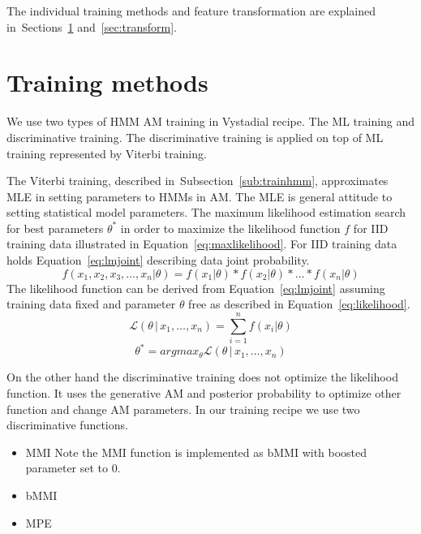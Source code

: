 The individual training methods and feature transformation are explained
in~Sections~\ref{sec:methods} and~\ref{sec:transform}.

\section{Training methods} 
\label{sec:methods}
We use two types of \ac{HMM} \ac{AM} training in Vystadial recipe. 
The \acl{ML} training and discriminative training.
The discriminative training is applied on top of \ac{ML} training represented by Viterbi training.

The Viterbi training, described in~Subsection~\ref{sub:trainhmm}, approximates \ac{MLE} in setting parameters to \ac{HMM}s in \ac{AM}.
The \ac{MLE} is general attitude to setting statistical model parameters.
The maximum likelihood estimation search for best parameters $\theta^*$ 
in order to maximize the likelihood function $f$ for \ac{IID} training data illustrated in Equation~\ref{eq:maxlikelihood}.
For \ac{IID} training data holds Equation~\ref{eq:lmjoint} describing data joint probability. 
\begin{equation}\label{eq:lmjoint}
    f(x_1, x_2, x_3, \ldots, x_n | \theta) = f(x_1 | \theta) * f(x_2 | \theta) * \ldots * f(x_n | \theta)
\end{equation}
The likelihood function can be derived from Equation~\ref{eq:lmjoint} assuming training data fixed
and parameter $\theta$ free as described in Equation~\ref{eq:likelihood}.
\begin{equation}\label{eq:likelihood}
    \mathcal{L}(\theta\,|\,x_1,\ldots,x_n) = \sum_{i=1}^n f(x_i|\theta)
\end{equation}
\begin{equation}\label{eq:maxlikelihood}
    \theta^* = argmax_{\theta} \mathcal{L}(\theta\,|\,x_1,\ldots,x_n)
\end{equation}

On the other hand the discriminative training does not optimize the likelihood function.
It uses the generative \ac{AM} and posterior probability to optimize 
other function and change \ac{AM} parameters.
In our training recipe we use two discriminative functions.
\begin{itemize}
    \item \acl{MMI}\cite{chow1990maximum} 
        Note the \ac{MMI} function is implemented as \acs{bMMI} with boosted parameter set to 0.
    \item \acl{bMMI}\cite{povey2008boosted}
    \item \acl{MPE}\cite{povey2003mmi}
\end{itemize}

